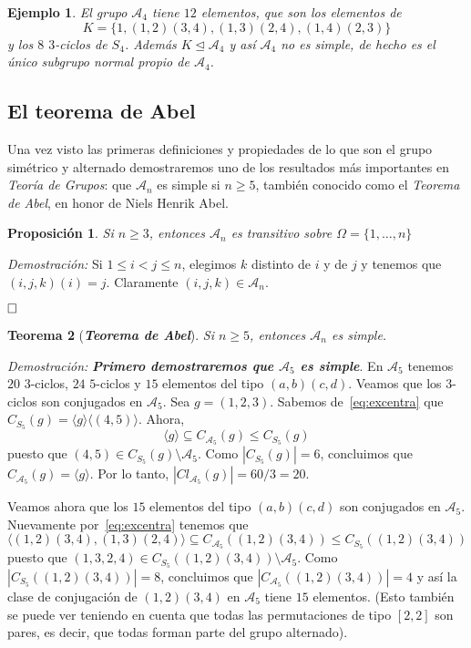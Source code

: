 \documentclass[12pt]{article}
\newtheorem{theorem}{Teorema}[section]
\newtheorem{proposition}[theorem]{Proposición}
\newtheorem{example}{Ejemplo}[theorem]
\begin{document}
\begin{example} El grupo $\mathcal{A}_{4}$ tiene $12$ elementos, que son los elementos de $$K = \lbrace 1,(1,2)(3,4),(1,3)(2,4),(1,4)(2,3) \rbrace$$ y los $8$ $3$-ciclos de $S_{4}$. Además $K \unlhd \mathcal{A}_{4}$ y así $\mathcal{A}_{4}$ no es simple, de hecho es el único subgrupo normal propio de $\mathcal{A}_{4}$.
\end{example}

\subsection{El teorema de Abel}

Una vez visto las primeras definiciones y propiedades de lo que son el grupo simétrico y alternado demostraremos uno de los resultados más importantes en \textit{Teoría de Grupos}: que $\mathcal{A}_{n}$ es simple si $n \geq 5$, también conocido como el \textit{Teorema de Abel}, en honor de Niels Henrik Abel.

\begin{proposition}\label{eq:preabel} Si $n \geq 3$, entonces $\mathcal{A}_{n}$ es transitivo sobre $\Omega =\lbrace 1, \ldots, n \rbrace$
\end{proposition}
\emph{Demostración: } Si $1 \leq i <j \leq n$, elegimos $k$ distinto de $i$ y de $j$ y tenemos que $(i,j,k)(i) = j$. Claramente $(i,j,k) \in \mathcal{A}_{n}$.

$\hfill \square$

\begin{theorem}[\textbf{\textit{Teorema de Abel}}] Si $n \geq 5$, entonces $\mathcal{A}_{n}$ es simple.
\end{theorem}
\emph{Demostración: }\textbf{\textit{Primero demostraremos que $\mathcal{A}_{5}$ es simple}}. En $\mathcal{A}_{5}$ tenemos $20$ $3$-ciclos, $24$ $5$-ciclos y $15$ elementos del tipo $(a,b)(c,d)$. Veamos que los $3$-ciclos son conjugados en $\mathcal{A}_{5}$. Sea $g = (1,2,3)$. Sabemos de~\ref{eq:excentra} que $C_{S_{5}}(g)= \langle g\rangle \langle(4,5) \rangle$. Ahora, $$\langle g \rangle \subseteq C_{\mathcal{A}_{5}}(g) \leq C_{S_{5}}(g)$$ puesto que $(4,5) \in C_{S_{5}}(g) \setminus \mathcal{A}_{5}$. Como $|C_{S_{5}}(g)| = 6$, concluimos que $C_{\mathcal{A}_{5}}(g) = \langle g \rangle$. Por lo tanto, $|Cl_{\mathcal{A}_{5}}(g)| = 60/3 = 20.$ 

Veamos ahora que los $15$ elementos del tipo $(a,b)(c,d)$ son conjugados en $\mathcal{A}_{5}$. Nuevamente por~\ref{eq:excentra} tenemos que $$\langle (1,2)(3,4),(1,3)(2,4) \rangle \subseteq C_{\mathcal{A}_{5}}((1,2)(3,4)) \leq C_{S_{5}}((1,2)(3,4))$$ puesto que $(1,3,2,4) \in C_{S_{5}}((1,2)(3,4)) \setminus \mathcal{A}_{5}$. Como $|C_{S_{5}}((1,2)(3,4))| = 8$, concluimos que $|C_{\mathcal{A}_{5}}((1,2)(3,4))| = 4$ y así la clase de conjugación de $(1,2)(3,4)$ en $\mathcal{A}_{5}$ tiene $15$ elementos. (Esto también se puede ver teniendo en cuenta que todas las permutaciones de tipo $[2,2]$ son pares, es decir, que todas forman parte del grupo alternado).
\end{document}
